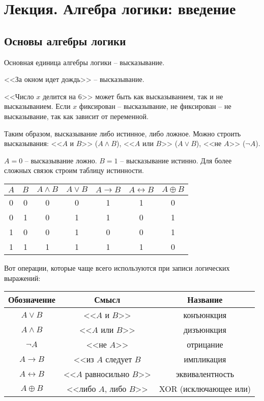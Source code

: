 \section{Лекция. Алгебра логики: введение}
\subsection{Основы алгебры логики}
Основная единица алгебры логики -- высказывание.

<<За окном идет дождь>> -- высказывание.

<<Число $x$ делится на 6>> может быть как высказыванием, так и не высказыванием.
Если $x$ фиксирован -- высказывание, не фиксирован -- не высказывание, так как зависит от переменной.

Таким образом, высказывание либо истинное, либо ложное.
Можно строить высказывания: <<$A$ и $B$>> ($A\wedge B$), <<$A$ или $B$>> ($A\vee B$), <<не $A$>> ($\neg A$).

$A = 0$ -- высказывание ложно. $B = 1$ -- высказывание истинно.
Для более сложных связок строим таблицу истинности.

\begin{center}
    \begin{tabular}{|c|c|c|c|c|c|c|}
    \hline
     $A$ & $B$ & $A\wedge B$ & $A \vee B$ & $A \to B$ & $A \leftrightarrow B$ & $A \oplus B$\\
    \hline
      0 & 0 & 0 & 0 & 1 & 1 & 0\\
      0 & 1 & 0 & 1 & 1 & 0 & 1\\
      1 & 0 & 0 & 1 & 0 & 0 & 1\\
      1 & 1 & 1 & 1 & 1 & 1 & 0\\
    \hline
\end{tabular}
\end{center}

Вот операции, которые чаще всего используются при записи логических выражений:
\begin{center}
\begin{tabular}{|c|c|c|}
    \hline
    \textbf{Обозначение} & \textbf{Смысл} & \textbf{Название}\\
    \hline
    $A \lor B$ & <<$A$ и $B$>> & конъюнкция\\
    \hline
    $A \land B$ & <<$A$ или $B$>> & дизъюнкция\\
    \hline
    $\neg A$ & <<не $A$>> & отрицание\\
    \hline
    $A \to B$ & <<из $A$ следует $B$ & импликация\\
    \hline
    $A \leftrightarrow B$ & <<$A$ равносильно $B$>> & эквивалентность\\
    \hline
    $A \oplus B$ & <<либо $A$, либо $B$>> & XOR (исключающее или)\\
    \hline
\end{tabular}
\end{center}


